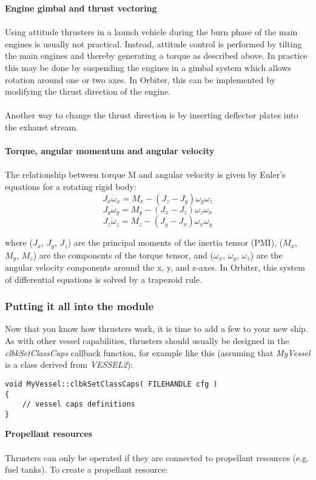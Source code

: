 \documentclass[Orbiter Developer Manual.tex]{subfiles}
\begin{document}
\noindent
\textbf{Engine gimbal and thrust vectoring}\\
\\
Using attitude thrusters in a launch vehicle during the burn phase of the main engines is usually not practical. Instead, attitude control is performed by tilting the main engines and thereby generating a torque as described above. In practice this may be done by suspending the engines in a gimbal system which allows rotation around one or two axes. In Orbiter, this can be implemented by modifying the thrust direction of the engine.\\
\\
Another way to change the thrust direction is by inserting deflector plates into the exhaust stream.\\
\\
\textbf{Torque, angular momentum and angular velocity}\\
\\
The relationship between torque M and angular velocity is given by Euler's equations for a rotating rigid body:
\[ J_{x}\dot{\omega}_{x} = M_{x} - (J_{z} - J_{y})\omega_{y}\omega_{z} \]
\[ J_{y}\dot{\omega}_{y} = M_{y} - (J_{x} - J_{z})\omega_{z}\omega_{x} \]
\[ J_{z}\dot{\omega}_{z} = M_{z} - (J_{y} - J_{x})\omega_{x}\omega_{y} \]

\noindent
where ($J_{x}$, $J_{y}$, $J_{z}$) are the principal moments of the inertia tensor (PMI), ($M_{x}$, $M_{y}$, $M_{z}$) are the components of the torque tensor, and ($\omega_{x}$, $\omega_{y}$, $\omega_{z}$) are the angular velocity components around the x, y, and z-axes. In Orbiter, this system of differential equations is solved by a trapezoid rule.


\subsubsection{Putting it all into the module}
Now that you know how thrusters work, it is time to add a few to your new ship. As with other vessel capabilities, thrusters should usually be designed in the \textit{clbkSetClassCaps} callback function, for example like this (assuming that \textit{MyVessel} is a class derived from \textit{VESSEL2}):

\begin{lstlisting}
void MyVessel::clbkSetClassCaps( FILEHANDLE cfg )
{
	// vessel caps definitions
}
\end{lstlisting}

\noindent
\textbf{Propellant resources}\\
\\
Thrusters can only be operated if they are connected to propellant resources (e.g. fuel tanks). To create a propellant resource:
\end{document}
